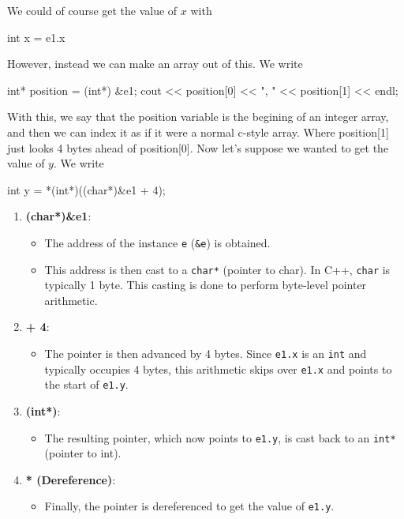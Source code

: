 \documentclass{report}
\begin{document}
    \pagebreak \bigbreak \noindent 
    We could of course get the value of $x$ with 
    \bigbreak \noindent 
    \begin{cppcode}
    int x = e1.x
    \end{cppcode}
    \bigbreak \noindent 
    However, instead we can make an array out of this. We write 
    \bigbreak \noindent 
    \begin{cppcode}
        int* position = (int*) &e1;
        cout << position[0] << ", " << position[1] << endl;
    \end{cppcode}
    \bigbreak \noindent 
    With this, we say that the position variable is the begining of an integer array, and then we can index it as if it were a normal c-style array. Where position[1] just looks 4 bytes ahead of position[0].
    \bigbreak \noindent 
    Now let's suppose we wanted to get the value of $y$. We write 
    \bigbreak \noindent 
    \begin{cppcode}
        int y = *(int*)((char*)&e1 + 4);
    \end{cppcode}
    \bigbreak \noindent 
    \begin{enumerate}
        \item \textbf{(char*)\&e1}: 
            \begin{itemize}
                \item The address of the instance \texttt{e} (\texttt{\&e}) is obtained.
                \item This address is then cast to a \texttt{char*} (pointer to char). In C++, \texttt{char} is typically 1 byte. This casting is done to perform byte-level pointer arithmetic.
            \end{itemize}

        \item \textbf{+ 4}:
            \begin{itemize}
                \item The pointer is then advanced by 4 bytes. Since \texttt{e1.x} is an \texttt{int} and typically occupies 4 bytes, this arithmetic skips over \texttt{e1.x} and points to the start of \texttt{e1.y}.
            \end{itemize}

        \item \textbf{(int*)}:
            \begin{itemize}
                \item The resulting pointer, which now points to \texttt{e1.y}, is cast back to an \texttt{int*} (pointer to int).
            \end{itemize}

        \item \textbf{* (Dereference)}:
            \begin{itemize}
                \item Finally, the pointer is dereferenced to get the value of \texttt{e1.y}.
            \end{itemize}
    \end{enumerate}
    \bigbreak \noindent 
\end{document}
